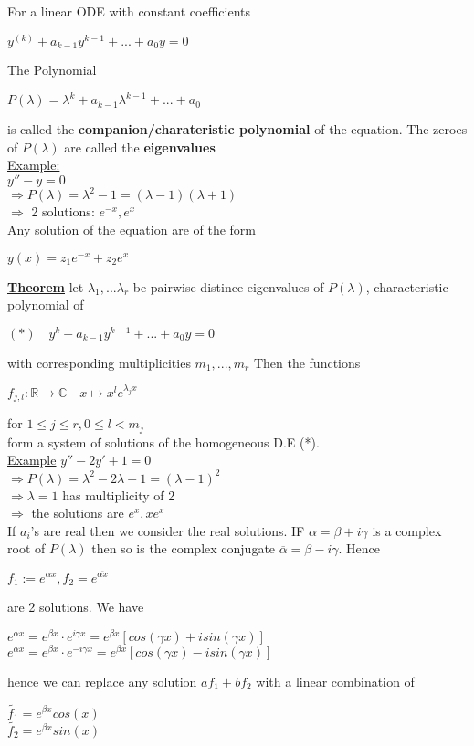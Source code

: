 \documentclass[8pt]{extreport}
\begin{document}
 For a linear ODE with constant coefficients
\begin{center}
$y^{(k)} + a_{k-1}y^{k-1} + ... + a_0y = 0$
\end{center}
The Polynomial
\begin{center}
$P(\lambda) = \lambda^{k} + a_{k-1}\lambda^{k-1} + ... + a_0$
\end{center}
is called the \textbf{companion/charateristic polynomial} of the equation. The zeroes of $P(\lambda)$ are called the \textbf{eigenvalues}\\
\underline{Example:}\\
$y''-y = 0$\\
$\Rightarrow P(\lambda) = \lambda^2-1 = (\lambda- 1)(\lambda + 1)$\\
$\Rightarrow$ 2 solutions: $e^{-x},e^{x}$\\
Any solution of the equation are of the form
\begin{center}
$y(x) = z_1e^{-x } + z_2e^{x}$
\end{center}

\underline{\textbf{Theorem}} let $\lambda_1,...\lambda_r$ be pairwise distince eigenvalues of $P(\lambda)$, characteristic polynomial of 
\begin{center}
$(*)\quad y^k + a_{k-1}y^{k-1} + ... + a_0y = 0$
\end{center}
with corresponding multiplicities $m_1,...,m_r$ Then the functions
\begin{center}
$f_{j,l} :\mathbb{R} \rightarrow \mathbb{C} \quad x \mapsto x^le^{\lambda_jx}$
\end{center}
for $1 \leq j \leq r, 0 \leq l < m_j$\\
form a system of solutions of the homogeneous D.E (*).\\
\newline
\underline{Example}
$y'' -2y' + 1 = 0$\\
$\Rightarrow P(\lambda) = \lambda^2 - 2 \lambda + 1 = (\lambda -1)^2$\\
$\Rightarrow \lambda = 1$ has multiplicity of 2\\
$\Rightarrow$ the solutions are $e^x, xe^x$\\


If $a_i$'s are real then we consider the real solutions. IF $\alpha = \beta + i\gamma$ is a complex root of $P(\lambda)$ then so is the complex conjugate $\overline{\alpha} = \beta - i \gamma$. Hence 

\begin{center}
$f_1:= e^{\alpha x} , f_2 = e^{\overline{\alpha x}}$
\end{center}
are 2 solutions. We have
\begin{center}
$e^{\alpha x} = e^{\beta x} \cdot e^{i\gamma x}= e^{\beta x}[cos(\gamma x) +i sin(\gamma x)]$\\
$e^{\overline{\alpha}x} = e^{\beta x} \cdot e^{-i\gamma x} = e^{\beta x}[cos(\gamma x) -i sin(\gamma x)]$
\end{center}
hence we can replace any solution $af_1 + bf_2$ with a linear combination of
\begin{center}
$\tilde{f_1} = e^{\beta x}cos(x)$\\
$\tilde{f_2} = e^{\beta x}sin(x)$
\end{center}
\end{document}

